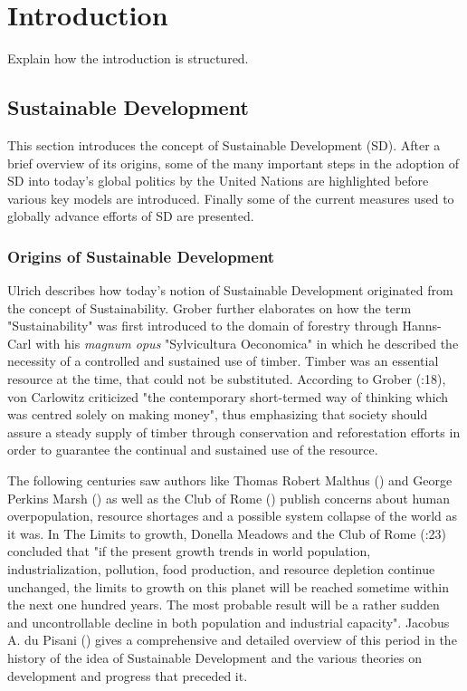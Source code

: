 	
	\section{Introduction}
	
	Explain how the introduction is structured.
		
		\subsection{Sustainable Development}
    		This section introduces the concept of Sustainable Development (SD). After a brief overview of its origins, some of the many important steps in the adoption of SD into today's global politics by the United Nations are highlighted before various key models are introduced. Finally some of the current measures used to globally advance efforts of SD are presented.
		
		    \subsubsection{Origins of Sustainable Development}
		        Ulrich \citet{grober2007} describes how today's notion of Sustainable Development originated from the concept of Sustainability. Grober further elaborates on how the term "Sustainability" was first introduced to the domain of forestry through Hanns-Carl \citet{voncarlowitz1732} with his \textit{magnum opus} "Sylvicultura Oeconomica" in which he described the necessity of a controlled and sustained use of timber. Timber was an essential resource at the time, that could not be substituted. According to Grober (\citeyear{grober2007}:18), von Carlowitz criticized "the contemporary short-termed way of thinking which was centred solely on making money", thus emphasizing that society should assure a steady supply of timber through conservation and reforestation efforts in order to guarantee the continual and sustained use of the resource.
		        \medskip
		        
		        The following centuries saw authors like Thomas Robert Malthus (\citeyear{malthus1926}) and George Perkins Marsh (\citeyear{marsh1965}) as well as the Club of Rome (\citeyear{meadows1972a}) publish concerns about human overpopulation, resource shortages and a possible system collapse of the world as it was. In The Limits to growth, Donella Meadows and the Club of Rome (\citeyear{meadows1972a}:23) concluded that "if the present growth trends in world population, industrialization, pollution, food production, and resource depletion continue unchanged, the limits to growth on this planet will be reached sometime within the next one hundred years. The most probable result will be a rather sudden and uncontrollable decline in both population and industrial capacity". Jacobus A. du Pisani (\citeyear{dupisani2006}) gives a comprehensive and detailed overview of this period in the history of the idea of Sustainable Development and the various theories on development and progress that preceded it.
		        \medskip
		        

